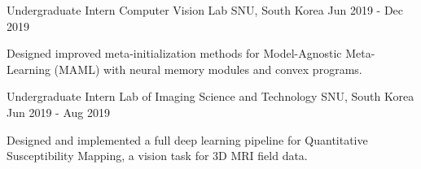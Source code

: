 \begin{cventries}
  \cventry
    {Undergraduate Intern} %
    {Computer Vision Lab} %
    {SNU, South Korea} %
    {Jun 2019 - Dec 2019} %
    {
      \begin{cvitems} %
        \item {Designed improved meta-initialization methods for Model-Agnostic Meta-Learning (MAML) with neural memory modules and convex programs.}
      \end{cvitems}
    }
    
  \cventry
    {Undergraduate Intern} %
    {Lab of Imaging Science and Technology} %
    {SNU, South Korea} %
    {Jun 2019 - Aug 2019} %
    {
      \begin{cvitems} %
        \item {Designed and implemented a full deep learning pipeline for Quantitative Susceptibility Mapping, a vision task for 3D MRI field data.}
      \end{cvitems}
    }

\end{cventries}
